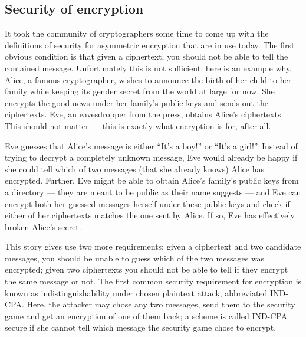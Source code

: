 \documentclass[envcountsame]{llncs}
\begin{document}
\subsection{Security of encryption}

It took the community of cryptographers some time to come up with the
definitions of security for asymmetric encryption that are in use today. The
first obvious condition is that given a ciphertext, you should not be able to
tell the contained message. Unfortunately this is not sufficient, here is an
example why.
Alice, a famous cryptographer, wishes to announce the birth of her child to her family while keeping its gender secret from the world at large for now. She
encrypts the good news under her family's public keys and sends out the
ciphertexts. Eve, an eavesdropper from the press, obtains Alice's ciphertexts.
This should not matter --- this is exactly what encryption is for, after all.

Eve guesses that Alice's message is either ``It's a boy!'' or ``It's a girl!''.
Instead of trying to decrypt a completely unknown message, Eve would already be
happy if she could tell which of two messages (that she already knows) Alice has
encrypted. Further, Eve might be able to obtain Alice's family's public keys
from a directory --- they are meant to be public as their name suggests --- and
Eve can encrypt both her guessed messages herself under these public keys and
check if either of her ciphertexts matches the one sent by Alice. If so, Eve has
effectively broken Alice's secret.

This story gives use two more requirements: given a ciphertext and two candidate
messages, you should be unable to guess which of the two messages was encrypted;
given two ciphertexts you should not be able to tell if they encrypt the same
message or not. The first common security requirement for encryption is known as
indistinguishability under chosen plaintext attack, abbreviated IND-CPA. Here,
the attacker may chose any two messages, send them to the security game and get
an encryption of one of them back; a scheme is called IND-CPA secure if she
cannot tell which message the security game chose to encrypt.
\end{document}
